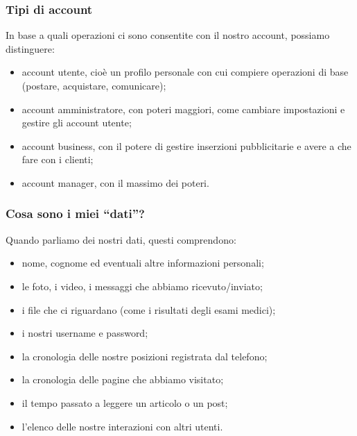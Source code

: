\documentclass[]{beamer}
\begin{document}
\begin{frame}
\frametitle{Tipi di account}
In base a quali operazioni ci sono consentite con il nostro account, possiamo distinguere:
\begin{itemize}
  \item \alert{account utente}, cioè un profilo personale con cui compiere operazioni di base (postare, acquistare, comunicare);\pause
  \item \alert{account amministratore}, con poteri maggiori, come cambiare impostazioni e gestire gli account utente;\pause
  \item \alert{account business}, con il potere di gestire inserzioni pubblicitarie e avere a che fare con i clienti;\pause
  \item \alert{account manager}, con il massimo dei poteri.
\end{itemize}
\end{frame}



\begin{frame}
\frametitle{Cosa sono i miei ``dati''?}
Quando parliamo dei nostri dati, questi comprendono:
\begin{itemize}
  \item nome, cognome ed eventuali altre informazioni personali;\pause
  \item le foto, i video, i messaggi che abbiamo ricevuto/inviato;\pause
  \item i file che ci riguardano (come i risultati degli esami medici);\pause
  \item i nostri username e password;\pause
  \item la cronologia delle nostre posizioni registrata dal telefono;\pause
  \item la cronologia delle pagine che abbiamo visitato;\pause
  \item il tempo passato a leggere un articolo o un post;\pause
  \item l'elenco delle nostre interazioni con altri utenti.
\end{itemize} 
\end{frame}
\end{document}
